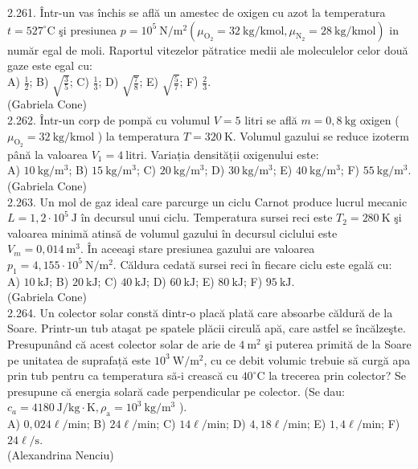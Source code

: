 2.261. Într-un vas închis se află un amestec de oxigen cu azot la temperatura $t=527^{\circ} \mathrm{C}$ şi presiunea $p=10^{5} \mathrm{~N} / \mathrm{m}^{2}\left(\mu_{\mathrm{O}_{2}}=32 \mathrm{~kg} / \mathrm{kmol}, \mu_{\mathrm{N}_{2}}=28 \mathrm{~kg} / \mathrm{kmol}\right)$ in număr egal de moli. Raportul vitezelor pătratice medii ale moleculelor celor două gaze este egal cu:\\ A) $\frac{1}{2}$; B) $\sqrt{\frac{3}{5}}$; C) $\frac{1}{3}$; D) $\sqrt{\frac{7}{8}}$; E) $\sqrt{\frac{5}{7}}$; F) $\frac{2}{3}$.\\ (Gabriela Cone)\\

2.262. Într-un corp de pompă cu volumul $V=5$ litri se află $m=0,8 \mathrm{~kg}$ oxigen ( $\mu_{\mathrm{O}_{2}}=32 \mathrm{~kg} / \mathrm{kmol}$ ) la temperatura $T=320 \mathrm{~K}$. Volumul gazului se reduce izoterm până la valoarea $V_{1}=4 \mathrm{~litri}$. Variația densității oxigenului este:\\ A) $10 \mathrm{~kg} / \mathrm{m}^{3}$; B) $15 \mathrm{~kg} / \mathrm{m}^{3}$; C) $20 \mathrm{~kg} / \mathrm{m}^{3}$; D) $30 \mathrm{~kg} / \mathrm{m}^{3}$; E) $40 \mathrm{~kg} / \mathrm{m}^{3}$; F) $55 \mathrm{~kg} / \mathrm{m}^{3}$.\\ (Gabriela Cone)\\

2.263. Un mol de gaz ideal care parcurge un ciclu Carnot produce lucrul mecanic $L=1,2 \cdot 10^{5} \mathrm{~J}$ în decursul unui ciclu. Temperatura sursei reci este $T_{2}=280 \mathrm{~K}$ şi valoarea minimă atinsă de volumul gazului în decursul ciclului este $V_{m}=0,014 \mathrm{~m}^{3}$. În aceeaşi stare presiunea gazului are valoarea $p_{1}=4,155 \cdot 10^{5} \mathrm{~N} / \mathrm{m}^{2}$. Căldura cedată sursei reci în fiecare ciclu este egală cu:\\ A) $10 \mathrm{~kJ}$; B) $20 \mathrm{~kJ}$; C) $40 \mathrm{~kJ}$; D) $60 \mathrm{~kJ}$; E) $80 \mathrm{~kJ}$; F) $95 \mathrm{~kJ}$.\\ (Gabriela Cone)\\

2.264. Un colector solar constă dintr-o placă plată care absoarbe căldură de la Soare. Printr-un tub ataşat pe spatele plăcii circulǎ apă, care astfel se încălzeşte. Presupunând că acest colector solar de arie de $4 \mathrm{~m}^{2}$ şi puterea primită de la Soare pe unitatea de suprafață este $10^{3} \mathrm{~W} / \mathrm{m}^{2}$, cu ce debit volumic trebuie să curgă apa prin tub pentru ca temperatura să-i crească cu $40^{\circ} \mathrm{C}$ la trecerea prin colector? Se presupune că energia solară cade perpendicular pe colector. (Se dau: $c_{a}=4180 \mathrm{~J} / \mathrm{kg} \cdot \mathrm{K}, \rho_{\mathrm{a}}=10^{3} \mathrm{~kg} / \mathrm{m}^{3}$ ).\\ A) $0,024 \ell / \mathrm{min}$; B) $24 \ell / \mathrm{min}$; C) $14 \ell / \mathrm{min}$; D) $4,18 \ell / \mathrm{min}$; E) $1,4 \ell / \mathrm{min}$; F) $24 \ell / \mathrm{s}$.\\ (Alexandrina Nenciu)\\

